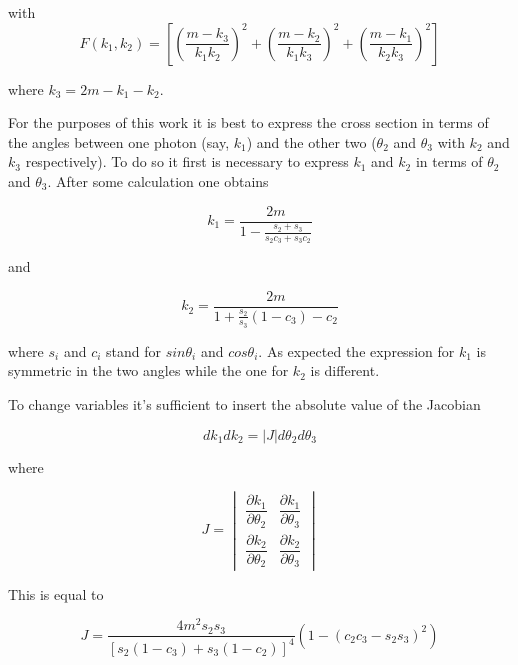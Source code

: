 \documentclass[10pt,a4paper,twocolumn]{article}
\begin{document}
with 
\begin{equation*}
    F(k_1,k_2)=\left[\left(\frac{m-k_3}{k_1k_2} \right)^2 + \left(\frac{m-k_2}{k_1k_3} \right)^2 + \left(\frac{m-k_1}{k_2k_3} \right)^2\right]
\end{equation*}


\noindent where $k_3=2m-k_1-k_2$.

\noindent For the purposes of this work it is best to express the cross section in terms of the angles between one photon (say, $k_1$) and the other two ($\theta_2$ and $\theta_3$ with $k_2$ and $k_3$ respectively). To do so it first is necessary to express $k_1$ and $k_2$ in terms of $\theta_2$ and $\theta_3$. After some calculation one obtains

\begin{equation}
    k_1=\frac{2m}{1-\frac{s_2+s_3}{s_2c_3+s_3c_2}}
\end{equation}

and 

\begin{equation}
    k_2=\frac{2m}{1+\frac{s_2}{s_3}(1-c_3)-c_2}
\end{equation}

\noindent where $s_i$ and $c_i$ stand for $sin\theta_i$ and $cos\theta_i$. As expected the expression for $k_1$ is symmetric in the two angles while the one for $k_2$ is different.

\noindent To change variables it's sufficient to insert the absolute value of the Jacobian

\begin{equation}
    dk_1dk_2=|J|d\theta_2d\theta_3
\end{equation}

where

\begin{equation}
     J= \begin{vmatrix} \dfrac{\partial k_1}{\partial \theta_2} & \dfrac{\partial k_1}{\partial \theta_3} \\[2ex] \dfrac{\partial k_2}{\partial \theta_2} & \dfrac{\partial k_2}{\partial \theta_3} \end{vmatrix}
\end{equation}
  
\noindent This is equal to

\begin{equation*}
     J= \frac{4m^2s_2s_3}{[s_2(1-c_3)+s_3(1-c_2)]^4}(1-(c_2c_3-s_2s_3)^2)
\end{equation*}

  
\end{document}
